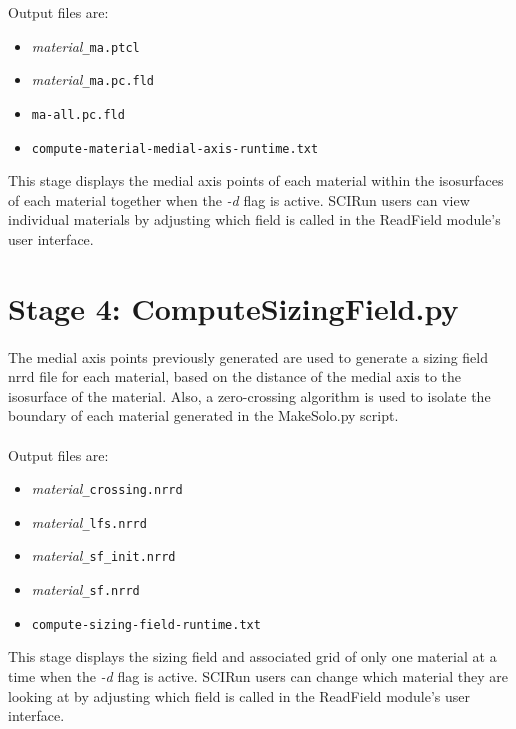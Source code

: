 \documentclass[fleqn,12pt,openany]{book}
\begin{document}
Output files are:
\begin{itemize}

\item{\emph{material}\verb+_ma.ptcl+}
\item{\emph{material}\verb+_ma.pc.fld+}
\item{\verb+ma-all.pc.fld+}
\item{\verb+compute-material-medial-axis-runtime.txt+}

\end{itemize}

This stage displays the medial axis points of each material within the 
isosurfaces of each material together when the \emph{-d} flag is active.  
SCIRun users can view individual materials by adjusting which field is 
called in the ReadField module's user interface.

\section{Stage 4: ComputeSizingField.py}

\paragraph{}
The medial axis points previously generated are used to generate a sizing field 
nrrd file for each material, based on the distance of the medial axis to the 
isosurface of the material. Also, a zero-crossing algorithm is used to isolate 
the boundary of each material generated in the MakeSolo.py script. \\ \\

Output files are:
\begin{itemize}

\item{\emph{material}\verb+_crossing.nrrd+}    
\item{\emph{material}\verb+_lfs.nrrd+}
\item{\emph{material}\verb+_sf_init.nrrd+}
\item{\emph{material}\verb+_sf.nrrd+}
\item{\verb+compute-sizing-field-runtime.txt+}

\end{itemize}

This stage displays the sizing field and associated grid of only one material 
at a time when the \emph{-d} flag is active. SCIRun users can change which 
material they are looking at by adjusting which field is called in the 
ReadField module's user interface.
\end{document}

